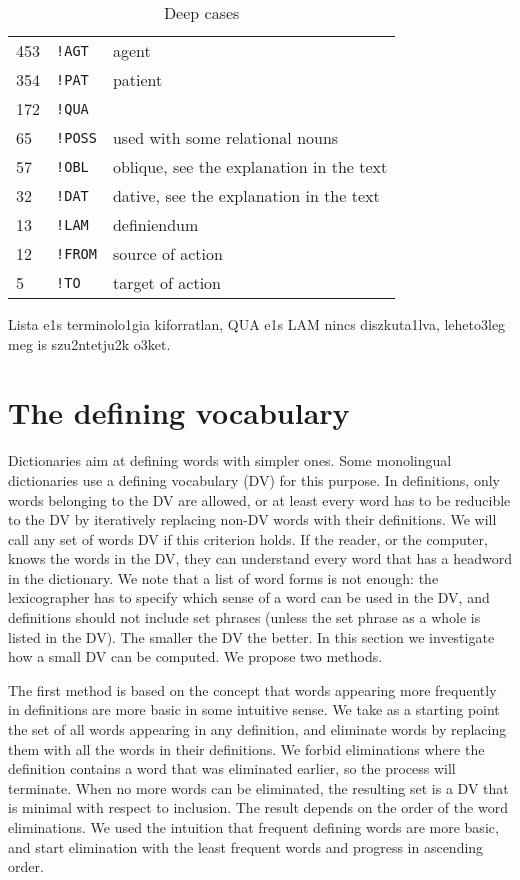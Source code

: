 \documentclass[a4paper,10pt]{article}
\begin{document}
\begin{table}
\begin{center}
\begin{tabular}{lll}
\\ 453	& \texttt{!AGT} & agent
\\ 354	& \texttt{!PAT} & patient
\\ 172	& \texttt{!QUA} & %
\\ 65	& \texttt{!POSS} & used with some relational nouns
\\ 57	& \texttt{!OBL} & oblique, see the explanation in the text
\\ 32	& \texttt{!DAT} & dative, see the explanation in the text
\\ 13	& \texttt{!LAM} & definiendum %
\\ 12	& \texttt{!FROM} & source of action
\\ 5	& \texttt{!TO}	& target of action
\end{tabular}

\end{center}
\caption{Deep cases}
\label{table_deep}
\end{table}

{\color{red} Lista e1s terminolo1gia kiforratlan, QUA e1s LAM nincs
  diszkuta1lva, leheto3leg meg is szu2ntetju2k o3ket.}

\section{The defining vocabulary}\label{sec_dv}%
Dictionaries aim at defining words with simpler ones. Some monolingual
dictionaries use a defining vocabulary (DV) for this purpose. In definitions,
only words belonging to the DV are allowed, or at least every word has to be
reducible to the DV by iteratively replacing non-DV words with their
definitions. We will call any set of words DV if this criterion holds.  If the
reader, or the computer, knows the words in the DV, they can understand every
word that has a headword in the dictionary.  We note that a list of word forms
is not enough: the lexicographer has to specify which sense of a word can be
used in the DV, and definitions should not include set phrases (unless the set
phrase as a whole is listed in the DV). The smaller the DV the better. In this
section we investigate how a small DV can be computed. We propose two methods.

The first method is based on the concept that words appearing more frequently
in definitions are more basic in some intuitive sense. We take as a starting
point the set of all words appearing in any definition, and eliminate words by
replacing them with all the words in their definitions. We forbid eliminations
where the definition contains a word that was eliminated earlier, so the
process will terminate. When no more words can be eliminated, the resulting
set is a DV that is minimal with respect to inclusion. The result depends on
the order of the word eliminations. We used the intuition that frequent
defining words are more basic, and start elimination with the least frequent
words and progress in ascending order.
\end{document}
